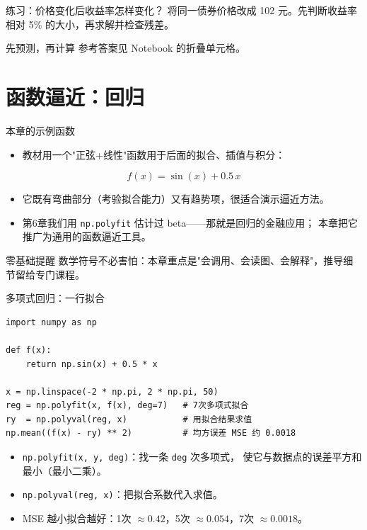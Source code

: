 \documentclass[9pt]{ctexbeamer}
\begin{document}
\begin{frame}{练习：价格变化后收益率怎样变化？}
将同一债券价格改成 102 元。先判断收益率相对 5\% 的大小，再求解并检查残差。
\medskip
\begin{block}{先预测，再计算}
参考答案见 Notebook 的折叠单元格。
\end{block}
\end{frame}

\section{函数逼近：回归}
\begin{frame}{本章的示例函数}
	\begin{itemize}
		\item 教材用一个"正弦+线性"函数用于后面的拟合、插值与积分：
	\end{itemize}
	\begin{equation*}
		f(x) = \sin(x) + 0.5\,x
	\end{equation*}
	\begin{itemize}
		\item 它既有弯曲部分（考验拟合能力）又有趋势项，很适合演示逼近方法。
		\item 第6章我们用 \texttt{np.polyfit} 估计过 beta——那就是回归的金融应用；
			本章把它推广为\alert{通用的函数逼近工具}。
	\end{itemize}
	\begin{alertblock}{零基础提醒}
		数学符号不必害怕：本章重点是"会调用、会读图、会解释"，推导细节留给专门课程。
	\end{alertblock}
\end{frame}

\begin{frame}[fragile]{多项式回归：一行拟合}
	\begin{lstlisting}
import numpy as np

def f(x):
    return np.sin(x) + 0.5 * x

x = np.linspace(-2 * np.pi, 2 * np.pi, 50)
reg = np.polyfit(x, f(x), deg=7)   # 7次多项式拟合
ry  = np.polyval(reg, x)           # 用拟合结果求值
np.mean((f(x) - ry) ** 2)          # 均方误差 MSE 约 0.0018
\end{lstlisting}
	\begin{itemize}
		\item \texttt{np.polyfit(x, y, deg)}：找一条 \texttt{deg} 次多项式，
			使它与数据点的误差平方和最小（最小二乘）。
		\item \texttt{np.polyval(reg, x)}：把拟合系数代入求值。
		\item MSE 越小拟合越好：1次 $\approx 0.42$，5次 $\approx 0.054$，7次 $\approx 0.0018$。
	\end{itemize}
\end{frame}
\end{document}
